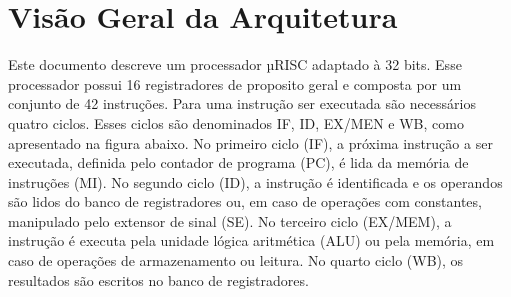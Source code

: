 \documentclass{report}
\begin{document}

\newpage
\section{Visão Geral da Arquitetura}
Este documento descreve um processador µRISC adaptado à 32 bits. Esse processador possui 16 registradores de proposito geral e composta por um conjunto de 42 instruções. \newline
Para uma instrução ser executada são necessários quatro ciclos. Esses ciclos são denominados IF, ID, EX/MEN e WB, como apresentado na figura abaixo. No primeiro ciclo (IF),  a próxima instrução a ser executada, definida pelo contador de programa (PC), é lida da memória de instruções (MI). No segundo ciclo (ID), a instrução é identificada e os operandos são lidos do banco de registradores ou, em caso de operações com constantes, manipulado pelo extensor de sinal (SE). No terceiro ciclo (EX/MEM), a instrução é executa pela unidade lógica aritmética (ALU) ou pela memória, em caso de operações de armazenamento ou leitura. No quarto ciclo (WB), os resultados são escritos no banco de registradores.
\end{document}
